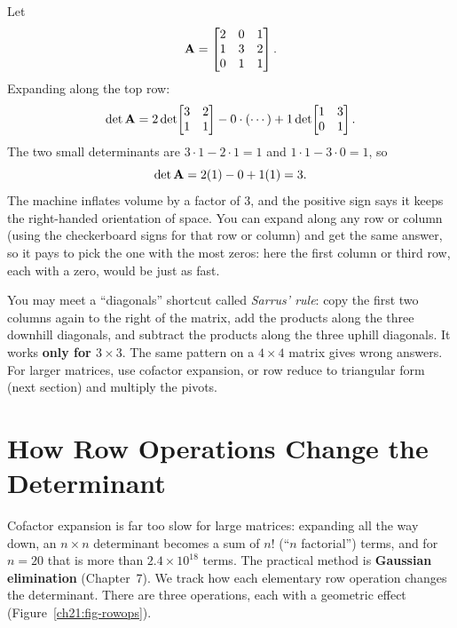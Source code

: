 \begin{example}
\label{ch21:ex-3x3}
Let
\[
  \mathbf{A} = \begin{bmatrix} 2 & 0 & 1 \\ 1 & 3 & 2 \\ 0 & 1 & 1 \end{bmatrix}.
\]
Expanding along the top row:
\[
  \det\mathbf{A}
  = 2\det\!\begin{bmatrix} 3 & 2 \\ 1 & 1 \end{bmatrix}
  - 0\cdot(\cdots)
  + 1\det\!\begin{bmatrix} 1 & 3 \\ 0 & 1 \end{bmatrix}.
\]
The two small determinants are $3\cdot1 - 2\cdot1 = 1$ and
$1\cdot1 - 3\cdot0 = 1$, so
\[
  \det\mathbf{A} = 2(1) - 0 + 1(1) = 3.
\]
The machine inflates volume by a factor of $3$, and the positive sign says it keeps
the right-handed orientation of space. You can expand along any row or column
(using the checkerboard signs for that row or column) and get the same answer, so it pays to pick the one with the most zeros: here
the first column or third row, each with a zero, would be just as fast.
\end{example}

\begin{trapbox}
You may meet a ``diagonals'' shortcut called \emph{Sarrus' rule}: copy the first
two columns again to the right of the matrix, add the products along the three
downhill diagonals, and subtract the products along the three uphill diagonals.
It works \textbf{only for $3\times 3$}. The same pattern on a $4\times 4$ matrix
gives wrong answers. For larger matrices, use cofactor expansion, or row reduce to triangular
form (next section) and multiply the pivots.
\end{trapbox}

\section{How Row Operations Change the Determinant}
\label{ch21:row-ops}

Cofactor expansion is far too slow for large matrices:
expanding all the way down, an $n\times n$ determinant becomes a sum of $n!$
(``$n$ factorial'') terms, and for $n = 20$ that is more than
$2.4\times 10^{18}$ terms. The practical method is
\textbf{Gaussian elimination} (Chapter~7). We track how each elementary row operation
changes the determinant. There are three operations, each with a
geometric effect (Figure~\ref{ch21:fig-rowops}).

